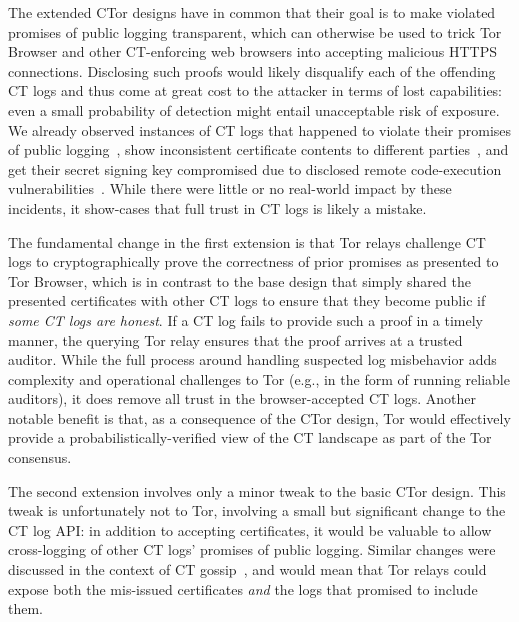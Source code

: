 The extended CTor designs have in common that their goal is to make violated
promises of public logging transparent, which can otherwise be used to trick Tor
Browser and other CT-enforcing web browsers into accepting malicious HTTPS
connections.  Disclosing such proofs would likely disqualify each of the
offending CT logs and thus come at great cost to the attacker in terms of lost
capabilities:
	even a small probability of detection might entail unacceptable risk of
	exposure.
We already observed instances of CT logs that happened to
	violate their promises of public logging~\cite{gdca1-omission},
	show inconsistent certificate contents to different
		parties~\cite{izenpe-disqualified,venafi-disqualified}, and
	get their secret signing key compromised due to disclosed remote
		code-execution vulnerabilities~\cite{digicert-log-compromised}. 
While there were little or no real-world impact by these incidents, it
show-cases that full trust in CT logs is likely a mistake.

The fundamental change in the first extension is that Tor relays challenge CT
logs to cryptographically prove the correctness of prior promises as presented
to Tor Browser, which is in contrast to the base design that simply shared the
presented certificates with other CT logs to ensure that they become public if
\emph{some CT logs are honest}. If a CT log fails to provide such a proof in a
timely manner, the querying Tor relay ensures that the proof arrives at a
trusted auditor.  While the full process around handling suspected log
misbehavior adds complexity and operational challenges to Tor (e.g., in the
form of running reliable auditors), it does remove all trust in the
browser-accepted CT logs.  Another notable benefit is that, as a consequence
of the CTor design, Tor would effectively provide a probabilistically-verified
view of the CT landscape as part of the Tor consensus.

The second extension involves only a minor tweak to the basic CTor design.  This
tweak is unfortunately not to Tor, involving a small but significant change to
the CT log API:
	in addition to accepting certificates, it would be valuable to allow
	cross-logging of other CT logs' promises of public logging.
Similar changes were discussed in the context of CT
gossip~\cite{minimal-gossip}, and would mean that Tor relays could expose both
the mis-issued certificates \emph{and} the logs that promised to include them.


